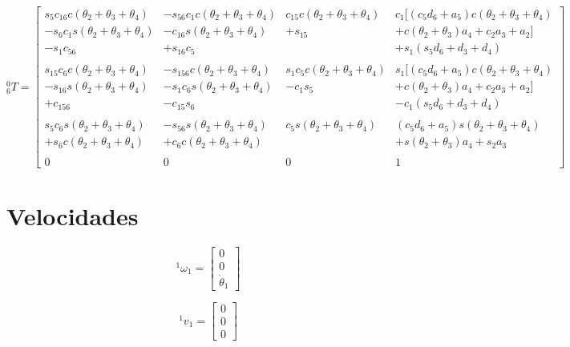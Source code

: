 \begin{equation}
    \label{eq:0T6}
    ^0_6T = \begin{bmatrix}
        s_5c_{16}c(\theta_2+\theta_3+\theta_4) & -s_{56}c_1c(\theta_2+\theta_3+\theta_4) & c_{15}c(\theta_2+\theta_3+\theta_4) & c_1[(c_5d_6 + a_5)c(\theta_2+\theta_3+\theta_4) \\
        -s_6c_1s(\theta_2+\theta_3+\theta_4) & -c_{16}s(\theta_2+\theta_3+\theta_4) & +s_{15} &  + c(\theta_2+\theta_3)a_4 + c_2a_3 + a_2]\\
        -s_1c_{56} & +s_{16}c_5 & & +s_1(s_5d_6 + d_3 + d_4)\\
        \\
        s_{15}c_6c(\theta_2+\theta_3+\theta_4) & -s_{156}c(\theta_2+\theta_3+\theta_4) & s_1c_5c(\theta_2+\theta_3+\theta_4) & s_1[(c_5d_6 + a_5)c(\theta_2+\theta_3+\theta_4) \\
        -s_{16}s(\theta_2+\theta_3+\theta_4) & -s_1c_6s(\theta_2+\theta_3+\theta_4) & -c_1s_5 &  + c(\theta_2+\theta_3)a_4 + c_2a_3 + a_2]\\
        +c_{156} & -c_{15}s_6 & & -c_1(s_5d_6 + d_3 + d_4)\\
        \\
        s_5c_6s(\theta_2+\theta_3+\theta_4) & -s_{56}s(\theta_2+\theta_3+\theta_4) & c_5s(\theta_2+\theta_3+\theta_4) & (c_5d_6 + a_5)s(\theta_2+\theta_3+\theta_4) \\
        +s_6c(\theta_2+\theta_3+\theta_4) & + c_6c(\theta_2+\theta_3+\theta_4) & & +s(\theta_2+\theta_3)a_4 + s_2a_3 \\
        \\
        0 & 0 & 0 & 1
    \end{bmatrix}
\end{equation}

\section{Velocidades}

\begin{equation}
    ^1\omega_1 = \begin{bmatrix}
        0 \\ 0 \\ \dot{\theta}_1
    \end{bmatrix}
\end{equation}

\begin{equation}
    ^1v_1 = \begin{bmatrix}
        0 \\ 0 \\ 0
    \end{bmatrix}
\end{equation}

